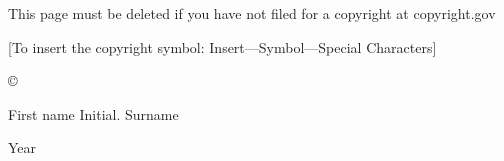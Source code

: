 \newpage

{\centering
This page must be deleted if you have not filed for a copyright at copyright.gov

[To insert the copyright symbol: Insert—Symbol—Special Characters]

\copyright

First name Initial. Surname

Year

}
